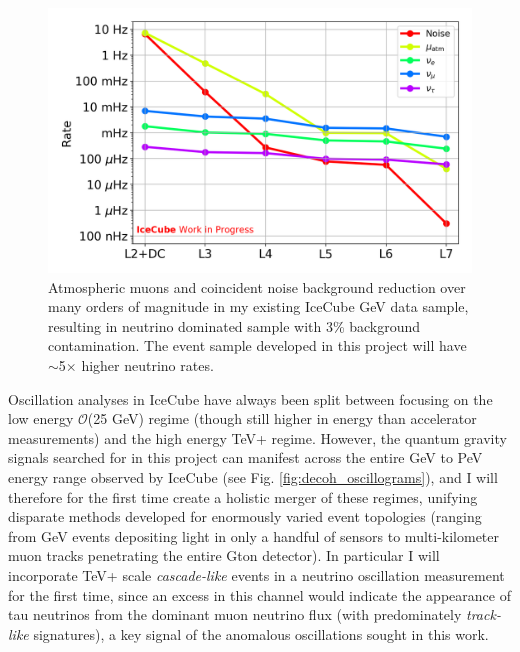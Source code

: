 \documentclass[a4paper,11pt]{article}
\begin{document}
\begin{figure} %
    \centering
    \includegraphics[trim=0.0cm 0.0cm 0.cm 0.0cm, clip=true, width=\linewidth]{images/OscNext_high_stats_event_selection_levels.png}
    \caption{Atmospheric muons and coincident noise background reduction over many orders of magnitude in my existing IceCube GeV data sample, resulting in neutrino dominated sample with 3\% background contamination. The event sample developed in this project will have $\sim$5$\times$ higher neutrino rates.}
    \label{fig:event_selection}
\end{figure}

Oscillation analyses in IceCube have always been split between focusing on the low energy $\mathcal{O}$(25 GeV) regime (though still higher in energy than accelerator measurements) and the high energy TeV+ regime. However, the quantum gravity signals searched for in this project can manifest across the entire GeV to PeV energy range observed by IceCube (see Fig. \ref{fig:decoh_oscillograms}), and I will therefore for the first time create a holistic merger of these regimes, unifying disparate methods developed for enormously varied event topologies (ranging from GeV events depositing light in only a handful of sensors to multi-kilometer muon tracks penetrating the entire Gton detector). In particular I will incorporate TeV+ scale \textit{cascade-like} events in a neutrino oscillation measurement for the first time, since an excess in this channel would indicate the appearance of tau neutrinos from the dominant muon neutrino flux (with predominately \textit{track-like} signatures), a key signal of the anomalous oscillations sought in this work.
\end{document}
